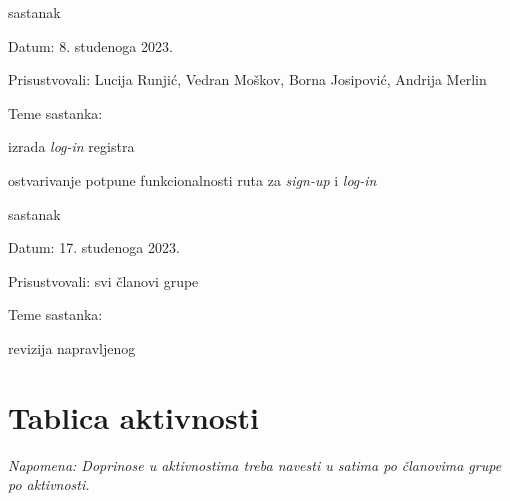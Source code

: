 \begin{packed_enum}
			\item sastanak
			
			\item[] \begin{packed_item}
				\item Datum: 8. studenoga 2023.
				\item Prisustvovali: Lucija Runjić, Vedran Moškov, Borna Josipović, Andrija Merlin
				\item Teme sastanka:
				\begin{packed_item}
					\item izrada \textit{log-in} registra
					\item ostvarivanje potpune funkcionalnosti ruta za \textit{sign-up} i \textit{log-in}
				\end{packed_item}
			\end{packed_item}
			
			\item sastanak
			
			\item[] \begin{packed_item}
				\item Datum: 17. studenoga 2023.
				\item Prisustvovali: svi članovi grupe
				\item Teme sastanka:
				\begin{packed_item}
					\item revizija napravljenog
				\end{packed_item}
			\end{packed_item}
		\end{packed_enum}
		
		
		
		\eject
		\section*{Tablica aktivnosti}
			
			 \textit{Napomena: Doprinose u aktivnostima treba navesti u satima po članovima grupe po aktivnosti.}

